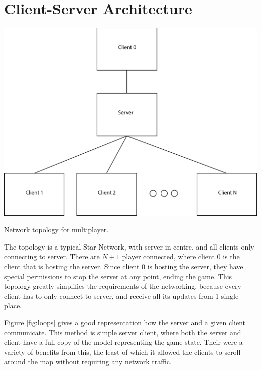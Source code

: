 \section{Client-Server Architecture}

\newcommand{\stepOneName}{lockstep}
\newcommand{\stepTwoName}{simple server client}
\newcommand{\stepThreeName}{server client with simulation}

\begin{marginfigure}
	\includegraphics{res/computer_communication_architecture/NetworkTopology.png}
	\caption[Network topology for multiplayer]{Network topology for multiplayer.}
	\label{fig:serverClientSychNetworkTopology}
\end{marginfigure}

The topology is a typical Star Network, with server in centre, and all clients only connecting to server.
There are $N+1$ player connected, where client 0 is the client that is hosting the server.
Since client 0 is hosting the server, they have special permissions to stop the server at any point, ending the game.
This topology greatly simplifies the requirements of the networking, because every client has to only connect to server, and receive all its updates from 1 single place. 

Figure \ref{fig:loops} gives a good representation how the server and a given client communicate.
This method is \stepTwoName, where both the server and client have a full copy of the model representing the game state.
Their were a variety of benefits from this, the least of which it allowed the clients to scroll around the map without requiring any network traffic.

